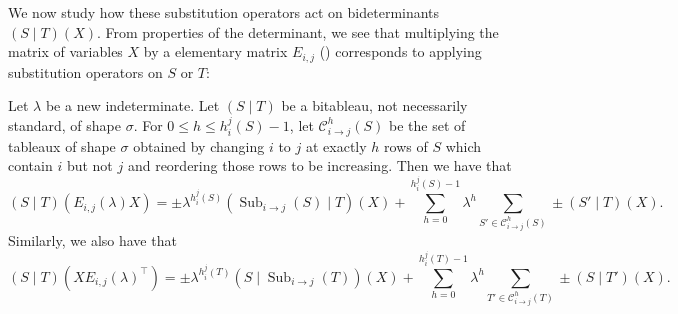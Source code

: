 \documentclass[10pt,a4paper]{amsart}
\DeclareMathOperator{\Sub}{Sub}
\begin{document}
We now study how these substitution operators act on bideterminants $(S \mid T)(X)$.
From properties of the determinant, we see that multiplying the matrix of variables $X$ by a elementary matrix $E_{i, j}$ () corresponds to applying substitution operators on $S$ or $T$:
\begin{lem}\label{lem:Eij_left_mult}
    Let $\lambda$ be a new indeterminate.
    Let $(S \mid T)$ be a bitableau, not necessarily standard, of shape $\sigma$.
    For $0 \leq h \leq h_{i}^{j}(S) - 1$, let $\mathcal{C}^{h}_{i \to j}(S)$ be the set of tableaux of shape $\sigma$ obtained by changing $i$ to $j$ at exactly $h$ rows of $S$ which contain $i$ but not $j$ and reordering those rows to be increasing.
    Then we have that
    \begin{equation}\label{eq:Eij_left_mult}
        (S \mid T)(E_{i, j}(\lambda)X) = \pm \lambda^{h_{i}^{j}(S)} (\Sub_{i \to j}(S) \mid T)(X) + \sum_{h = 0}^{h_{i}^{j}(S) - 1} \lambda^h \sum_{S' \in \mathcal{C}^{h}_{i \to j}(S)} \pm  (S' \mid T)(X).
    \end{equation}
    Similarly, we also have that
    \begin{equation}\label{eq:Eij_right_mult}
        (S \mid T)(X E_{i, j}(\lambda)^{\top}) = \pm \lambda^{h_{i}^{j}(T)} (S \mid \Sub_{i \to j}(T))(X) + \sum_{h = 0}^{h_{i}^{j}(T) - 1} \lambda^h \sum_{T' \in \mathcal{C}^{h}_{i \to j}(T)} \pm (S \mid T')(X).
    \end{equation}
\end{lem}
\end{document}

